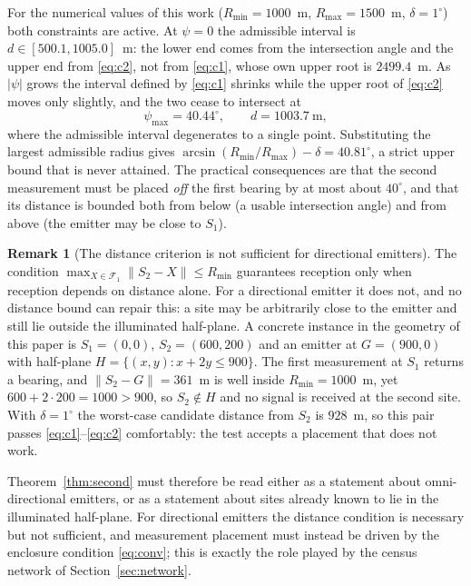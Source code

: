\documentclass[journal,10pt]{IEEEtran}
\theoremstyle{definition}
\newtheorem{remark}[theorem]{Remark}
\newcommand{\Rmin}{R_{\min}}
\newcommand{\Rmax}{R_{\max}}
\newcommand{\bF}{\mathcal{F}}
\begin{document}
For the numerical values of this work ($\Rmin=1000$~m, $\Rmax=1500$~m, $\delta=1^\circ$)
both constraints are active. At $\psi=0$ the admissible interval is
$d\in[500.1,1005.0]$~m: the lower end comes from the intersection angle and the upper end from
\eqref{eq:c2}, not from \eqref{eq:c1}, whose own upper root is $2499.4$~m. As $|\psi|$ grows the
interval defined by \eqref{eq:c1} shrinks while the upper root of \eqref{eq:c2} moves only
slightly, and the two cease to intersect at
\begin{equation}
\psi_{\max}=40.44^\circ,\qquad d=1003.7\ \text{m},
\label{eq:psimax}
\end{equation}
where the admissible interval degenerates to a single point. Substituting the largest admissible
radius gives $\arcsin(\Rmin/\Rmax)-\delta=40.81^\circ$, a strict upper bound that is never
attained. The practical consequences are that the second measurement must be placed \emph{off} the
first bearing by at most about $40^\circ$, and that its distance is bounded both from below (a
usable intersection angle) and from above (the emitter may be close to $S_1$).


\begin{remark}[The distance criterion is not sufficient for directional emitters]
\label{rem:dirsecond}
The condition $\max_{X\in\bF_1}\|S_2-X\|\le\Rmin$ guarantees reception only when reception depends
on distance alone. For a directional emitter it does not, and no distance bound can repair this: a
site may be arbitrarily close to the emitter and still lie outside the illuminated half-plane.
A concrete instance in the geometry of this paper is $S_1=(0,0)$, $S_2=(600,200)$ and an emitter at
$G=(900,0)$ with half-plane $H=\{(x,y):x+2y\le900\}$. The first measurement at $S_1$ returns a
bearing, and $\|S_2-G\|=361$~m is well inside $\Rmin=1000$~m, yet
$600+2\cdot200=1000>900$, so $S_2\notin H$ and no signal is received at the second site. With
$\delta=1^\circ$ the worst-case candidate distance from $S_2$ is $928$~m, so this pair passes
\eqref{eq:c1}--\eqref{eq:c2} comfortably: the test accepts a placement that does not work.

Theorem~\ref{thm:second} must therefore be read either as a statement about omni-directional
emitters, or as a statement about sites already known to lie in the illuminated half-plane. For
directional emitters the distance condition is necessary but not sufficient, and measurement
placement must instead be driven by the enclosure condition \eqref{eq:conv}; this is exactly the
role played by the census network of Section~\ref{sec:network}.
\end{remark}
\end{document}
